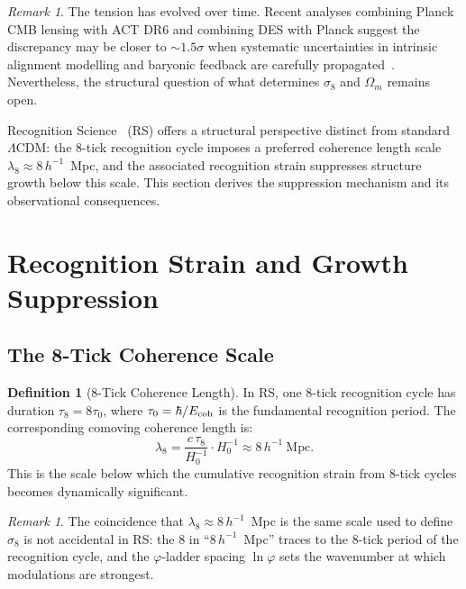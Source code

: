 \documentclass[12pt,a4paper]{article}
\theoremstyle{definition}
\newtheorem{definition}[theorem]{Definition}
\theoremstyle{remark}
\newtheorem{remark}[theorem]{Remark}
\begin{document}
\begin{remark}
The tension has evolved over time.  Recent analyses combining Planck CMB
lensing with ACT DR6 and combining DES with Planck suggest the
discrepancy may be closer to $\sim 1.5\sigma$ when systematic
uncertainties in intrinsic alignment modelling and baryonic feedback are
carefully propagated~\cite{Madhavacheril2024}.  Nevertheless, the
structural question of what determines $\sigma_8$ and $\Omega_m$
remains open.
\end{remark}

Recognition Science~\cite{RS_Axioms} (RS) offers a structural perspective distinct from standard
$\Lambda$CDM: the 8-tick recognition cycle imposes a preferred
coherence length scale $\lambda_8 \approx 8\,h^{-1}$~Mpc, and
the associated recognition strain suppresses structure growth below
this scale.  This section derives the suppression mechanism and its
observational consequences.

\section{Recognition Strain and Growth Suppression}
\label{sec:strain}

\subsection{The 8-Tick Coherence Scale}

\begin{definition}[8-Tick Coherence Length]
In RS, one 8-tick recognition cycle has duration $\tau_8 = 8\tau_0$,
where $\tau_0 = \hbar/E_{\rm coh}$ is the fundamental recognition period.
The corresponding comoving coherence length is:
\[
  \lambda_8 = \frac{c\,\tau_8}{H_0^{-1}} \cdot H_0^{-1}
  \approx 8\,h^{-1}~\text{Mpc}.
\]
This is the scale below which the cumulative recognition strain from
8-tick cycles becomes dynamically significant.
\end{definition}

\begin{remark}
The coincidence that $\lambda_8 \approx 8\,h^{-1}$~Mpc is the same
scale used to define $\sigma_8$ is not accidental in RS: the $8$
in ``$8\,h^{-1}$~Mpc'' traces to the 8-tick period of the recognition
cycle, and the $\varphi$-ladder spacing $\ln\varphi$ sets the
wavenumber at which modulations are strongest.
\end{remark}
\end{document}
